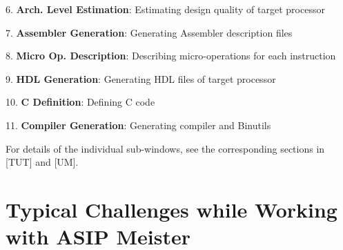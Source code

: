 6. \textbf{Arch. Level Estimation}: Estimating design quality of target
processor

7. \textbf{Assembler Generation}: Generating Assembler description files

8. \textbf{Micro Op. Description}: Describing micro-operations for each
instruction

9. \textbf{HDL Generation}: Generating HDL files of target processor

10. \textbf{C Definition}: Defining C code

11. \textbf{Compiler Generation}: Generating compiler and Binutils

For details of the individual sub-windows, see the corresponding
sections in {[}TUT{]} and {[}UM{]}.

\hypertarget{typical-challenges-while-working-with-asip-meister}{%
\section{Typical Challenges while Working with ASIP
Meister}\label{typical-challenges-while-working-with-asip-meister}}


